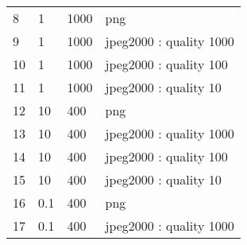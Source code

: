 \begin{table}[htpb]
\begin{tabular}{l|lll}
8       & 1                                                                                                        & 1000                                                                                         & png                     \\
9       & 1                                                                                                        & 1000                                                                                         & jpeg2000 : quality 1000 \\
10      & 1                                                                                                        & 1000                                                                                         & jpeg2000 : quality 100  \\
11      & 1                                                                                                        & 1000                                                                                         & jpeg2000 : quality 10   \\
12      & 10                                                                                                       & 400                                                                                          & png                     \\
13      & 10                                                                                                       & 400                                                                                          & jpeg2000 : quality 1000 \\
14      & 10                                                                                                       & 400                                                                                          & jpeg2000 : quality 100  \\
15      & 10                                                                                                       & 400                                                                                          & jpeg2000 : quality 10   \\
16      & 0.1                                                                                                      & 400                                                                                          & png                     \\
17      & 0.1                                                                                                      & 400                                                                                          & jpeg2000 : quality 1000 \\

\end{tabular}
\end{table}
